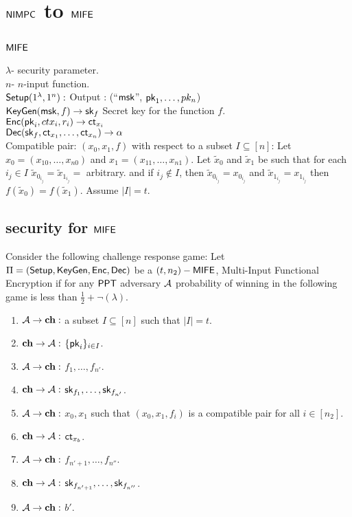 \section{$\mathsf{NIMPC}$ to $\mathsf{MIFE}$}
\subsection{$\mathsf{MIFE}$}
$\lambda$- security parameter.\\
$n$- $n$-input function.\\
$\mathsf{Setup}(1^{\lambda},1^n):$ Output : (``$\mathsf{msk}$'', $\mathsf{pk}_1, \ldots ,pk_n$)\\
$\mathsf{KeyGen}(\mathsf{msk}, f) \rightarrow \mathsf{sk}_f$ Secret key for the function $f$.\\
$\mathsf{Enc}(\mathsf{pk}_i, ctx_i, r_i)\rightarrow \mathsf{ct}_{x_i}$\\
$\mathsf{Dec}(\mathsf{sk}_f,\mathsf{ct}_{x_1},\ldots, \mathsf{ct}_{x_n})\rightarrow \alpha$\\ 
Compatible pair: $(x_0,x_1,f)$ with respect to a subset $I\subseteq [n]$: Let $x_0=(x_{10},\ldots, x_{n0})$ and $x_1=(x_{11},\ldots, x_{n1})$. Let $\tilde{x}_0$ and $\tilde{x}_1$ be such that for each $i_j\in I$ $\tilde{x}_{0_{i_j}}=\tilde{x}_{1_{i_j}}=$ arbitrary. and if $i_j\notin I$, then $\tilde{x}_{0_{i_j}}=x_{0_{i_j}}$ and $\tilde{x}_{1_{i_j}}=x_{1_{i_j}}$ then $f(\tilde{x}_0)=f(\tilde{x}_1)$. Assume $|I|=t$.

\subsection{security for $\mathsf{MIFE}$}
Consider the following challenge response game: Let $\Pi=(\mathsf{Setup}, \mathsf{KeyGen}, \mathsf{Enc}, \mathsf{Dec})$ be a $(t,n_2)-\mathsf{MIFE}$, Multi-Input Functional Encryption if for any $\mathsf{PPT}$ adversary $\mathcal{A}$ probability of winning in the following game is less than $\frac{1}{2}+ \neg(\lambda)$.
\begin{enumerate}
	\item $\mathcal{A} \rightarrow \mathbf{ch}:$ a subset $I\subseteq[n]$ such that $|I|= t$.
	\item $\mathbf{ch} \rightarrow \mathcal{A}:$ $\{\mathsf{pk}_i\}_{i\in I}$.
	\item $\mathcal{A} \rightarrow \mathbf{ch}:$ $f_1,\ldots,f_{n'}$.
	\item $\mathbf{ch} \rightarrow \mathcal{A}:$ $\mathsf{sk}_{f_1},\ldots, \mathsf{sk}_{f_{n'}}$.
	\item $\mathcal{A} \rightarrow \mathbf{ch}:$ $x_0, x_1$ such that $(x_0,x_1,f_i)$ is a compatible pair for all $i\in[n_2]$.
	\item $\mathbf{ch} \rightarrow \mathcal{A}:$ $\mathsf{ct}_{x_b}$.
	\item $\mathcal{A} \rightarrow \mathbf{ch}:$ $f_{n'+1},\ldots,f_{n''}$.
	\item $\mathbf{ch} \rightarrow \mathcal{A}:$ $\mathsf{sk}_{f_{n'+1}},\ldots, \mathsf{sk}_{f_{n''}}$.
	\item $\mathcal{A} \rightarrow \mathbf{ch}:$ $b'$.
\end{enumerate}

